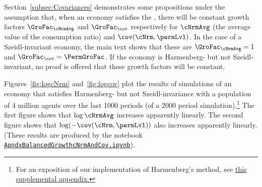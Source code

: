 \documentclass[\econtexRoot/BufferStockTheory]{subfiles}
\begin{document}
\label{sec:ApndxBalancedGrowthcNrmAndCov}

Section~\ref{subsec:Covariances} demonstrates some propositions under the assumption that, when an economy satisfies the {\GICRaw}, there will be constant growth factors $\GroFac_{\cNrmAvg}$ and $\GroFac_{\cov}$ respectively for $\cNrmAvg$ (the average value of the consumption ratio) and $\cov(\cNrm,\permLvl)$.  In the case of a Szeidl-invariant economy, the main text shows that these are $\GroFac_{\cNrmAvg}=1$ and $\GroFac_{\cov}=\PermGroFac$.  If the economy is Harmenberg- but not Szeidl-invariant, no proof is offered that these growth factors will be constant.


Figures~\ref{fig:logcNrm} and~\ref{fig:logcov} plot the results of simulations of an economy that satisfies Harmenberg- but not Szeidl-invariance with a population of 4 million agents over the last 1000 periods (of a 2000 period simulation).\footnote{For an exposition of our implementation of Harmenberg's method, see \href{https://github.com/econ-ark/BufferStockTheory/blob/master/Appendices/ApndxHarKmenberg.pdf}{this supplemental appendix.}}  The first figure shows that $\log \cNrmAvg$ increases apparently linearly.  The second figure shows that $\log (-\cov(\cNrm,\permLvl))$ also increases apparently linearly.  (These results are produced by the notebook \href{https://github.com/econ-ark/BufferStockTheory/blob/master/Code/Python/ApndxBalancedGrowthcNrmAndCov.ipynb}{\texttt{ApndxBalancedGrowthcNrmAndCov.ipynb}}).
\end{document}
